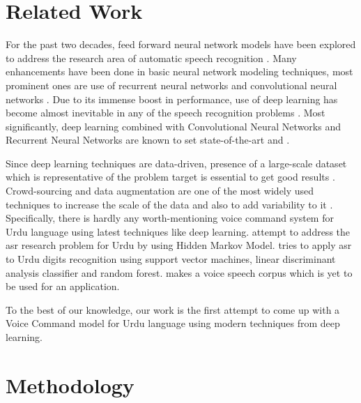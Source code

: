 \documentclass[conference]{IEEEtran}
\begin{document}
\section{Related Work} \label{RelatedWork}

For the past two decades, feed forward neural network models have been explored to address the research area of automatic speech recognition \cite{bourlard2012connectionist}. Many enhancements have been done in basic neural network modeling techniques, most prominent ones are use of recurrent neural networks and convolutional neural networks \cite{robinson1996use,sainath2013deep}. Due to its immense boost in performance, use of deep learning has become almost inevitable in any of the speech recognition problems \cite{mohamed2012acoustic,hinton2012deep,dahl2012context,jaitly2012application}. Most significantly, deep learning combined with Convolutional Neural Networks and Recurrent Neural Networks are known to set state-of-the-art \cite{abdel2012applying} and \cite{graves2013speech}. 

Since deep learning techniques are data-driven, presence of a large-scale dataset which is representative of the problem target is essential to get good results \cite{HannunCCCDEPSSCN14}. Crowd-sourcing and data augmentation are one of the most widely used techniques to increase the scale of the data and also to add variability to it \cite{1315150,sainath2013deep,HannunCCCDEPSSCN14}.
Specifically, there is hardly any worth-mentioning voice command system for Urdu language using latest techniques like deep learning. \cite{7571287} attempt to address the asr research problem for Urdu by using Hidden Markov Model. \cite{ali2015automatic} tries to apply asr to Urdu digits recognition using support vector machines, linear discriminant analysis classifier and random forest. \cite{raza2018rapid} makes a voice speech corpus which is yet to be used for an application.

To the best of our knowledge, our work is the first attempt to come up with a Voice Command model for Urdu language using modern techniques from deep learning.


\section{Methodology}\label{Methodology}
\end{document}

